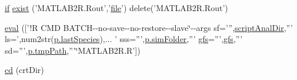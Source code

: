 \begin{DoxyCompactItemize}
\item 
\hyperlink{a00030_a01d55766b8058903dd360b4bda71f9f5}{if} \hyperlink{a00032_ab41b8dc78dee42a1a5e5a33d8bf6eeb3}{exist} ('M\-A\-T\-L\-A\-B2\-R.\-Rout','\hyperlink{a00110_a4e8353d6c62cf54bf4a1a8f63e56b8c3}{file}') delete('M\-A\-T\-L\-A\-B2\-R.\-Rout')
\item 
\hyperlink{a00032_ab4c95c2d6a84263412f5679a78b55e41}{eval} (\mbox{[}'!R C\-M\-D B\-A\-T\-C\-H-\/-\/no-\/save-\/-\/no-\/restore-\/-\/slave\char`\"{}-\/-\/args sf=''',\hyperlink{a00032_a2a07fff00b80967a40ae67d91fd31cb4}{script\-Anal\-Dir},''' ls=',num2str(\hyperlink{a00032_aad7be196243f3c9ca83dfee7c9111014}{p.\-last\-Species}),...
        ' sss=''',\hyperlink{a00032_aa671e3345005bd599e662bcaa115b18a}{p.\-sim\-Folder},''' \hyperlink{a00032_a5714ee99d309183e59b051e92e5a44d1}{gfs}=''',\hyperlink{a00032_a5714ee99d309183e59b051e92e5a44d1}{gfs},''' sd=''',\hyperlink{a00032_a1e5a4863ab2b87f923e1d19e2da1f5ac}{p.\-tmp\-Path},'''\char`\"{}M\-A\-T\-L\-A\-B2\-R.\-R'\mbox{]})
\item 
\hyperlink{a00032_a2160a514930abbfa9436b787b4cfc8ab}{cd} (crt\-Dir)
\end{DoxyCompactItemize}
